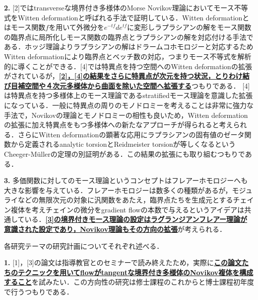 \documentclass[11pt,a4j,dvipdfmx]{jarticle} 					%
\newcommand{\研究課題名}{象の卵}
\newcommand{\研究機関名}{京都大学}
\newcommand{\研究代表者氏名}{福士謙二}
\begin{document}
\vspace{1mm}
\noindent
\textbf{2.}
[2]ではtransverseな境界付き多様体のMorse Novikov理論においてモース不等式をWitten deformationと呼ばれる手法で証明している．Witten deformationとはモース関数$f$を用いて外微分を$e^{-tf}de^{tf}$に変形しラプラシアンの解をモース関数の臨界点に局所化しモース関数の臨界点とラプラシアンの解を対応付ける手法である．ホッジ理論よりラプラシアンの解はドラームコホモロジーと対応するためWitten deformationにより臨界点とベッチ数の対応，つまりモース不等式を解析的に導くことができる．[4]では特異点を持つ空間へのWitten deformationの拡張がされているが，\textbf{\ul{[2]，[4]の結果をさらに特異点が次元を持つ状況，とりわけ結び目補空間や４次元多様体から曲面を除いた空間へ拡張する}}つもりである．
[4]は特異点を持つ多様体上のモース理論であるstratifiedモース理論を意識した拡張になっている．一般に特異点の周りのモノドロミーを考えることは非常に強力な手法で，Novikovの理論とモノドロミーの相性も良いため，Witten deformationの拡張に加え特異点をもつ多様体への新たなアプローチが得られると考えられる．さらにWitten deformationの顕著な応用にラプラシアンの固有値のゼータ関数から定義されるanalytic torsionとReidmeister torsionが等しくなるというCheeger-M\"{u}llerの定理の別証明がある．この結果の拡張にも取り組むつもりである．


\vspace{1mm}

\noindent
\textbf{3. }
多価関数に対してのモース理論というコンセプトはフレアーホモロジーへも大きな影響を与えている．フレアーホモロジーは数多くの種類があるが，モジュライなどの無限次元の対象に汎関数をあたえ，臨界点たちを生成元とするチェイン複体を考えチェインの微分をgradient flowの本数で与えるというアイデアは共通している．\textbf{\ul{[3]の境界付きモース理論の設定はラグランジアンフレアー理論が意識された設定であり，Novikov理論もその方向の拡張}}が考えられる．



\noindent
{}

各研究テーマの研究計画についてそれぞれ述べる．

\noindent
\textbf{1. }[1]，[3]の論文は指導教官とのセミナーで読み終えたため，実際に\textbf{\ul{この論文たちのテクニックを用いてflowがtangentな境界付き多様体のNovikov複体を構成すること}}を試みたい．この方向性の研究は修士課程のこれからと博士課程初年度で行うつもりである．
\end{document}

